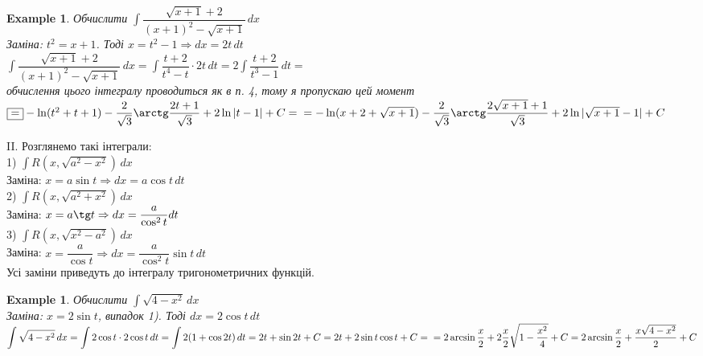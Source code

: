 \documentclass[a4paper, 10pt]{article}
\def\huge{\displaystyle}
\theoremstyle{theoremdd}
\theoremstyle{theoremdd}
\theoremstyle{theoremdd}
\theoremstyle{theoremdd}
\theoremstyle{theoremdd}
\newtheorem{example}[theorem]{Example}
\theoremstyle{theoremdd}
\theoremstyle{theoremdd}
\theoremstyle{theoremdd}
\theoremstyle{theoremdd}
\begin{document}
\begin{example}
Обчислити $\huge \int \dfrac{\sqrt{x+1}+2}{(x+1)^2 - \sqrt{x+1}}\,dx$\\
Заміна: $t^2 = x+1$. Тоді $x = t^2 -1 \Rightarrow dx = 2t \,dt$\\
$\huge \int \dfrac{\sqrt{x+1}+2}{(x+1)^2 - \sqrt{x+1}}\,dx = \int \dfrac{t+2}{t^4-t} \cdot 2t\,dt = 2 \int \dfrac{t+2}{t^3-1}\,dt \boxed{=}$\\
обчислення цього інтегралу проводиться як в п. 4, тому я пропускаю цей момент\\
$\boxed{=} -\ln(t^2+t+1) - \dfrac{2}{\sqrt{3}} \arctg \dfrac{2t+1}{\sqrt{3}} + 2 \ln|t-1|+ C = \\
= -\ln(x+2+\sqrt{x+1}) - \dfrac{2}{\sqrt{3}} \arctg \dfrac{2\sqrt{x+1}+1}{\sqrt{3}} + 2 \ln|\sqrt{x+1}-1| + C$
\end{example}

II. Розглянемо такі інтеграли:\\
1) $\huge \int R(x,\sqrt{a^2-x^2})\,dx$\\
Заміна: $x = a\sin t \Rightarrow dx = a\cos t \,dt$
\bigskip \\

2) $\huge \int R(x,\sqrt{a^2+x^2})\,dx$\\
Заміна: $x = a\tg t \Rightarrow dx = \dfrac{a}{\cos^2 t} dt$\bigskip \\

3) $\huge \int R(x, \sqrt{x^2-a^2})\,dx$\\
Заміна: $x = \dfrac{a}{\cos t} \Rightarrow dx = \dfrac{a}{\cos^2 t} \sin t\,dt$\\

Усі заміни приведуть до інтегралу тригонометричних функцій.

\begin{example}
Обчислити $\huge \int \sqrt{4-x^2}\,dx$\\
Заміна: $x = 2\sin t$, випадок 1). Тоді $dx = 2 \cos t \,dt$\\
$\huge \int \sqrt{4-x^2}\,dx = \int 2 \cos t \cdot 2 \cos t \,dt = \int 2(1+\cos 2t)\,dt = 2t + \sin 2t + C = 2t + 2 \sin t \cos t + C = \\ = 2 \arcsin \frac{x}{2} + 2 \frac{x}{2} \sqrt{1-\frac{x^2}{4}}+C = 2 \arcsin \frac{x}{2} + \dfrac{x \sqrt{4-x^2}}{2} + C$
\end{example}
\end{document}
